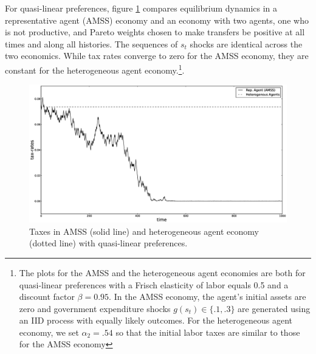 \documentclass[thmsb,11pt]{article}
\begin{document}
For quasi-linear preferences, figure \ref{fig: AMSS vs BEGS} compares equilibrium dynamics in a
representative agent (AMSS) economy and an economy with two agents, one who
is not productive, and  Pareto weights chosen to make
transfers be positive at all times  and along all  histories. The sequences of $s_t$ shocks are identical across the two economics.
 While tax rates converge to zero for the AMSS economy, they are constant for the heterogeneous agent economy.\footnote{The plots for the AMSS and the heterogeneous agent economies are both  for quasi-linear preferences with a Frisch elasticity of labor equals 0.5 and a discount factor $\beta=0.95$. In the AMSS economy,  the agent's  initial assets are zero  and  government expenditure shocks $g(s_t) \in\{.1,.3\}$ are generated using an IID process with equally likely outcomes.  For the heterogeneous agent economy, we set  $\alpha_2=.54$ so that the initial labor taxes are similar to those for the AMSS economy}. %



  \begin{figure}[htp]
 \centering
 \includegraphics[width=\textwidth]{Draft25Graphs/BEGS_AMSS.eps}
 \caption{Taxes in AMSS (solid line) and heterogeneous agent economy (dotted line) with quasi-linear preferences.}
 \label{fig: AMSS vs BEGS}
 \end{figure}
\end{document}

